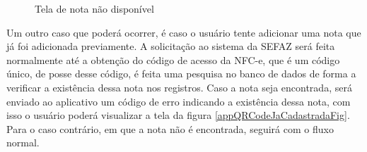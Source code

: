 \begin{figure}[h]
    \caption{Tela de nota não disponível}
    \label{appQRCodeNaoDisponivelFig}
\end{figure}

\newpage
Um outro caso que poderá ocorrer, é caso o usuário tente adicionar uma nota que já foi adicionada previamente. A solicitação ao sistema da SEFAZ será feita normalmente até a obtenção do código de acesso da NFC-e, que é um código único, de posse desse código, é feita uma pesquisa no banco de dados de forma a verificar a existência dessa nota nos registros. Caso a nota seja encontrada, será enviado ao aplicativo um código de erro indicando a existência dessa nota, com isso o usuário poderá visualizar a tela da figura \ref{appQRCodeJaCadastradaFig}. Para o caso contrário, em que a nota não é encontrada, seguirá com o fluxo normal.

